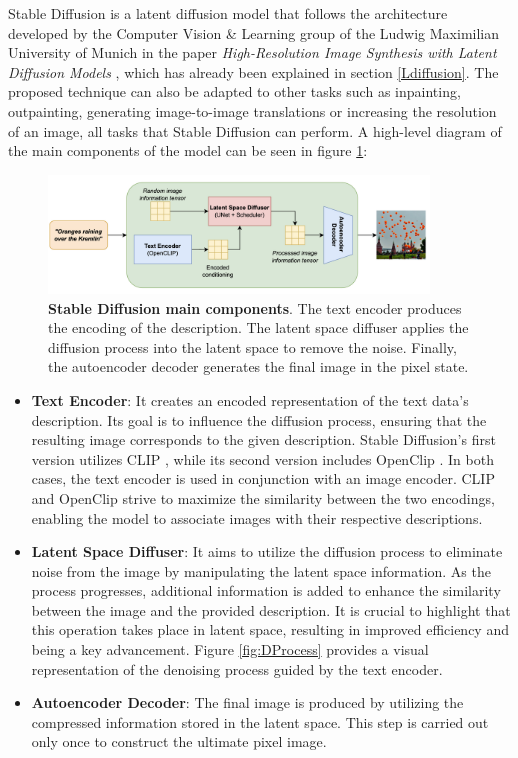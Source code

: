Stable Diffusion is a latent diffusion model that follows the architecture developed by the Computer Vision \& Learning group of the Ludwig Maximilian University of Munich in the paper \textit{High-Resolution Image Synthesis with Latent Diffusion Models} \cite{rombach2022high}, which has already been explained in section \ref{Ldiffusion}. The proposed technique can also be adapted to other tasks such as inpainting, outpainting, generating image-to-image translations or increasing the resolution of an image, all tasks that Stable Diffusion can perform. A high-level diagram of the main components of the model can be seen in figure \ref{fig:SDdiagram}:

\begin{figure}
    \centering
    \includegraphics[width=0.9\textwidth]{Pictures/SDdiagram.png} 
    \caption{\textbf{Stable Diffusion main components}. The text encoder produces the encoding of the description. The latent space diffuser applies the diffusion process into the latent space to remove the noise. Finally, the autoencoder decoder generates the final image in the pixel state.}
    \label{fig:SDdiagram}
\end{figure}

\begin{itemize}
    \item \textbf{Text Encoder}: It creates an encoded representation of the text data's description. Its goal is to influence the diffusion process, ensuring that the resulting image corresponds to the given description. Stable Diffusion's first version utilizes CLIP \cite{radford2021learning}, while its second version includes OpenClip \cite{cherti2022reproducible}. In both cases, the text encoder is used in conjunction with an image encoder. CLIP and OpenClip strive to maximize the similarity between the two encodings, enabling the model to associate images with their respective descriptions.
    \item \textbf{Latent Space Diffuser}: It aims to utilize the diffusion process to eliminate noise from the image by manipulating the latent space information. As the process progresses, additional information is added to enhance the similarity between the image and the provided description. It is crucial to highlight that this operation takes place in latent space, resulting in improved efficiency and being a key advancement. Figure \ref{fig:DProcess} provides a visual representation of the denoising process guided by the text encoder.
    \item \textbf{Autoencoder Decoder}: The final image is produced by utilizing the compressed information stored in the latent space. This step is carried out only once to construct the ultimate pixel image.
\end{itemize}

